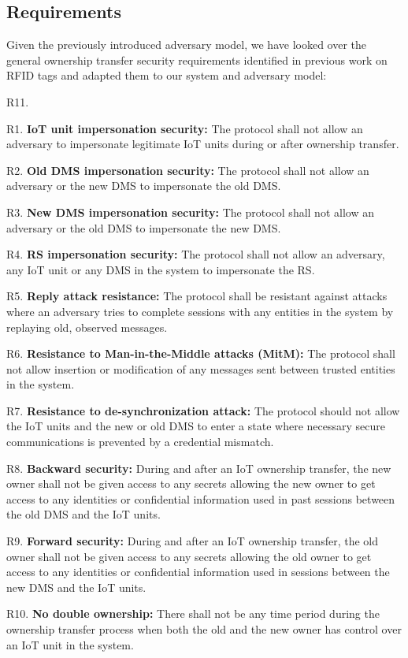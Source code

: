 {\subsection{Requirements}
\label{requirements}
Given the previously introduced adversary model, we have looked over the general ownership transfer security requirements identified in previous work on RFID tags \cite{taqieddin2018tag} and adapted them to our system and adversary model: 
\begin{labeling}{R11.}
\item [R1.] \textbf{IoT unit impersonation security:} The protocol shall not allow an adversary to impersonate legitimate IoT units during or after ownership transfer.
\item [R2.] \textbf{Old DMS impersonation security:} The protocol shall not allow an adversary or the new DMS to impersonate the old DMS.
\item [R3.] \textbf{New DMS impersonation security:} The protocol shall not allow an adversary or the old DMS to impersonate the new DMS.
\item [R4.] \textbf{RS impersonation security:} The protocol shall not allow an adversary, any IoT unit or any DMS in the system to impersonate the RS.
\item [R5.] \textbf{Reply attack resistance:} The protocol shall be resistant against attacks where an adversary tries to complete sessions with any entities in the system by replaying old, observed messages.
\item [R6.] \textbf{Resistance to Man-in-the-Middle attacks (MitM):} The protocol shall not allow insertion or modification of any messages sent between trusted entities in the system.
\item [R7.] \textbf{Resistance to de-synchronization attack:} The protocol should not allow the IoT units and the new or old DMS to enter a state where necessary secure communications is prevented by a credential mismatch. 
\item [R8.] \textbf{Backward security:} During and after an IoT ownership transfer, the new owner shall not be given access to any secrets allowing the new owner to get access to any identities or confidential information used in past sessions between the old DMS and the IoT units.
\item [R9.] \textbf{Forward security:} During and after an IoT ownership transfer, the old owner shall not be given access to any secrets allowing the old owner to get access to any identities or confidential information used in sessions between the new DMS and the IoT units.
 \item [R10.] \textbf{No double ownership:} There shall not be any time period during the ownership transfer process when both the old and the new owner has control over an IoT unit in the system.
\end{labeling}

}
